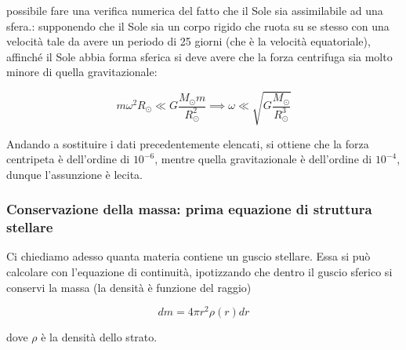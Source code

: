 \E possibile fare una verifica numerica del fatto che il Sole sia assimilabile ad una sfera.: supponendo che il Sole sia un corpo rigido che ruota su se stesso con una velocità tale da avere un periodo di 25 giorni (che è la velocità equatoriale), affinché il Sole abbia forma sferica si deve avere che la forza centrifuga sia molto minore di quella gravitazionale:

$$m\omega^2R_{\odot} \ll G\frac{M_{\odot}m}{R_{\odot}^2}
\implies
\omega \ll \sqrt{G\frac{M_{\odot}}{R_{\odot}^3}}$$

Andando a sostituire i dati precedentemente elencati, si ottiene che la forza centripeta è dell'ordine di $10^{-6}$, mentre quella gravitazionale è dell'ordine di $10^{-4}$, dunque l'assunzione è lecita.

\subsubsection{Conservazione della massa: prima equazione di struttura stellare}

\begin{minipage}{0.265\textwidth}
    \begin{figure}[H]
        \centering
    \end{figure}
\end{minipage}
\begin{minipage}{0.73\textwidth}
    \vspace{0.3cm}Ci chiediamo adesso quanta materia contiene un guscio stellare. Essa si può calcolare con l'equazione di continuità, ipotizzando che dentro il guscio sferico si conservi la massa (la densità è funzione del raggio)

    \begin{equation*}
        dm=4\pi r^2 \rho(r) dr
    \end{equation*}

    dove $\rho$ è la densità dello strato.
\end{minipage}

